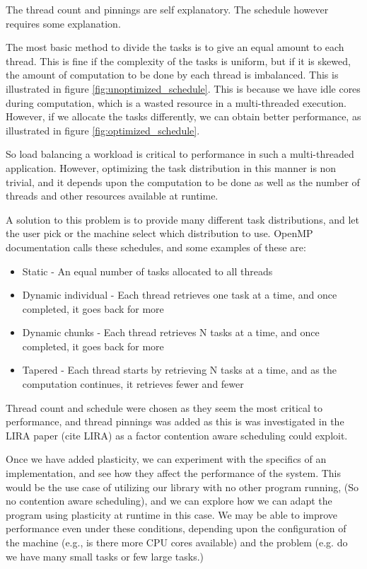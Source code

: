 The thread count and pinnings are self explanatory. The schedule however requires some explanation.

The most basic method to divide the tasks is to give an equal amount to each thread. This is fine if the complexity of the tasks is uniform, but if it is skewed, the amount of computation to be done by each thread is imbalanced. This is illustrated in figure \ref{fig:unoptimized_schedule}. This is because we have idle cores during computation, which is a wasted resource in a multi-threaded execution. However, if we allocate the tasks differently, we can obtain better performance, as illustrated in figure \ref{fig:optimized_schedule}.

So load balancing a workload is critical to performance in such a multi-threaded application. However, optimizing the task distribution in this manner is non trivial, and it depends upon the computation to be done as well as the number of threads and other resources available at runtime.

A solution to this problem is to provide many different task distributions, and let the user pick or the machine select which distribution to use. OpenMP documentation calls these schedules, and some examples of these are:

\begin{itemize}
	\item Static - An equal number of tasks allocated to all threads
	\item Dynamic individual - Each thread retrieves one task at a time, and once completed, it goes back for more
	\item Dynamic chunks - Each thread retrieves N tasks at a time, and once completed, it goes back for more
	\item Tapered - Each thread starts by retrieving N tasks at a time, and as the computation continues, it retrieves fewer and fewer
\end{itemize}

Thread count and schedule were chosen as they seem the most critical to performance, and thread pinnings was added as this is was investigated in the LIRA paper (cite LIRA) as a factor contention aware scheduling could exploit.

Once we have added plasticity, we can experiment with the specifics of an implementation, and see how they affect the performance of the system. This would be the use case of utilizing our library with no other program running, (So no contention aware scheduling), and we can explore how we can adapt the program using plasticity at runtime in this case. We may be able to improve performance even under these conditions, depending upon the configuration of the machine (e.g., is there more CPU cores available) and the problem (e.g. do we have many small tasks or few large tasks.) 


